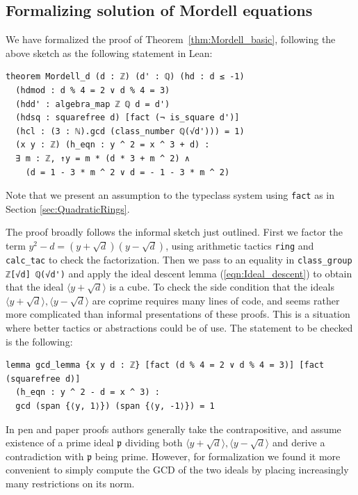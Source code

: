\documentclass[sigplan,10pt,nonacm,
screen]{acmart} \settopmatter{printfolios=true,printccs=false,printacmref=false}
\begin{document}
\subsection{Formalizing solution of Mordell equations}

We have formalized the proof of Theorem~\ref{thm:Mordell_basic}, following the above sketch as the following statement in Lean:
\begin{lstlisting}
theorem Mordell_d (d : ℤ) (d' : ℚ) (hd : d ≤ -1)
  (hdmod : d % 4 = 2 ∨ d % 4 = 3)
  (hdd' : algebra_map ℤ ℚ d = d')
  (hdsq : squarefree d) [fact (¬ is_square d')]
  (hcl : (3 : ℕ).gcd (class_number ℚ(√d'))) = 1)
  (x y : ℤ) (h_eqn : y ^ 2 = x ^ 3 + d) :
  ∃ m : ℤ, ↑y = m * (d * 3 + m ^ 2) ∧
    (d = 1 - 3 * m ^ 2 ∨ d = - 1 - 3 * m ^ 2)
\end{lstlisting}

Note that we present an assumption to the typeclass system using \lstinline{fact} as in Section \ref{sec:QuadraticRings}.

The proof broadly follows the informal sketch just outlined.
First we factor the term $y^2 - d = (y + \sqrt{d})(y - \sqrt d)$, using arithmetic tactics \lstinline{ring} and \lstinline{calc_tac} to check the factorization.
%
Then we pass to an equality in \lstinline{class_group ℤ[√d] ℚ(√d')} and apply the ideal descent lemma (\ref{eqn:Ideal_descent}) to obtain that the ideal $\langle y + \sqrt{d} \rangle$ is a cube.
To check the side condition that the ideals $\langle y + \sqrt{d} \rangle,\langle y - \sqrt{d} \rangle$ are coprime requires many lines of code, and seems rather more complicated than informal presentations of these proofs. This is a situation where better tactics or abstractions could be of use.
The statement to be checked is the following:
\begin{lstlisting}
lemma gcd_lemma {x y d : ℤ} [fact (d % 4 = 2 ∨ d % 4 = 3)] [fact (squarefree d)]
  (h_eqn : y ^ 2 - d = x ^ 3) :
  gcd (span {⟨y, 1⟩}) (span {⟨y, -1⟩}) = 1
\end{lstlisting}
In pen and paper proofs authors generally take the contrapositive, and assume existence of a prime ideal $\mathfrak p$ dividing both $\langle y + \sqrt{d} \rangle,\langle y - \sqrt{d} \rangle$ and derive a contradiction with $\mathfrak p$ being prime.
However, for formalization we found it more convenient to simply compute the GCD of the two ideals by placing increasingly many restrictions on its norm.
\end{document}
